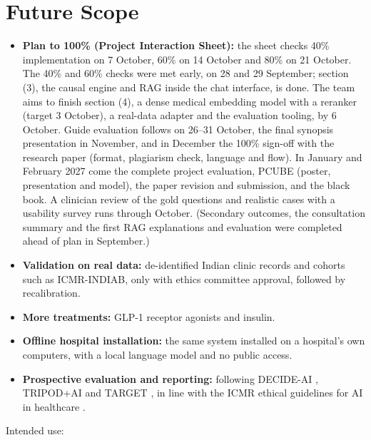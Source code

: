 \section{Future Scope}
\begin{itemize}
\item \textbf{Plan to 100\% (Project Interaction Sheet):} the sheet checks 40\% implementation on 7 October, 60\% on 14 October and 80\% on 21 October. The 40\% and 60\% checks were met early, on 28 and 29 September; section (3), the causal engine and RAG inside the chat interface, is done. The team aims to finish section (4), a dense medical embedding model with a reranker (target 3 October), a real-data adapter and the evaluation tooling, by 6 October. Guide evaluation follows on 26--31 October, the final synopsis presentation in November, and in December the 100\% sign-off with the research paper (format, plagiarism check, language and flow). In January and February 2027 come the complete project evaluation, PCUBE (poster, presentation and model), the paper revision and submission, and the black book. A clinician review of the gold questions and realistic cases with a usability survey runs through October. (Secondary outcomes, the consultation summary and the first RAG explanations and evaluation were completed ahead of plan in September.)
\item \textbf{Validation on real data:} de-identified Indian clinic records and cohorts such as ICMR-INDIAB, only with ethics committee approval, followed by recalibration.
\item \textbf{More treatments:} GLP-1 receptor agonists and insulin.
\item \textbf{Offline hospital installation:} the same system installed on a hospital's own computers, with a local language model and no public access.
\item \textbf{Prospective evaluation and reporting:} following DECIDE-AI \cite{vasey2022}, TRIPOD+AI \cite{collins2024} and TARGET \cite{cashin2025}, in line with the ICMR ethical guidelines for AI in healthcare \cite{icmr2023}.
\end{itemize}
\noindent Intended use: \intendeduse
